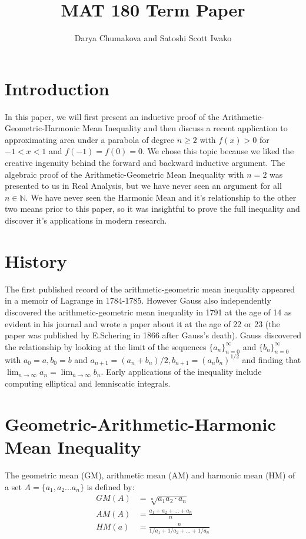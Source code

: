 \documentclass[12pt]{extreport}
\begin{document}
\title{MAT 180 Term Paper}
\author{Darya Chumakova and Satoshi Scott Iwako}
\maketitle

\section*{Introduction}
In this paper, we will first present an inductive proof of the Arithmetic-Geometric-Harmonic Mean Inequality and then discuss a recent application to approximating area under a parabola of degree $n \geq 2$ with $f(x) > 0$ for $-1 < x < 1$ and $f(-1) = f(0) = 0$. We chose this topic because we liked the creative ingenuity behind the forward and backward inductive argument. The algebraic proof of the Arithmetic-Geometric Mean Inequality with $n = 2$ was presented to us in Real Analysis, but we have never seen an argument for all $n \in \mathbb{N}$. We have never seen the Harmonic Mean and it's relationship to the other two means prior to this paper, so it was insightful to prove the full inequality and discover it's applications in modern research. 
\section*{History}
The first published record of the arithmetic-geometric mean inequality appeared in a memoir of Lagrange in 1784-1785. However Gauss also independently discovered the arithmetic-geometric mean inequality in 1791 at the age of 14 as evident in his journal and wrote a paper about it at the age of 22 or 23 (the paper was published by E.Schering in 1866 after Gauss's death). Gauss discovered the relationship by looking at the limit of the sequences $\{a_n\}_{n = 0}^{\infty}$ and $\{b_n\}_{n = 0}^{\infty}$ with $a_0 = a, b_0 = b$ and $a_{n+1} = (a_n + b_n)/2, b_{n+1} = (a_nb_n)^{1/2}$ and finding that $\lim_{n\to\infty} a_n = \lim_{n\to\infty} b_n$. Early applications of the inequality include computing elliptical and lemniscatic integrals.

\section*{Geometric-Arithmetic-Harmonic Mean Inequality}
The geometric mean (GM), arithmetic mean (AM) and harmonic mean (HM) of a set $A = \{a_1, a_2 ... a_n\}$ is defined by:
\begin{align*}
 GM(A) &= \sqrt[n]{a_1a_2 \cdot a_n} \\
 AM(A) &= \frac{a_1 + a_2 + ... + a_n}{n} \\
 HM(a) &= \frac{n}{1/a_1 + 1/a_2 + ... + 1/a_n}
\end{align*} 
\end{document}

